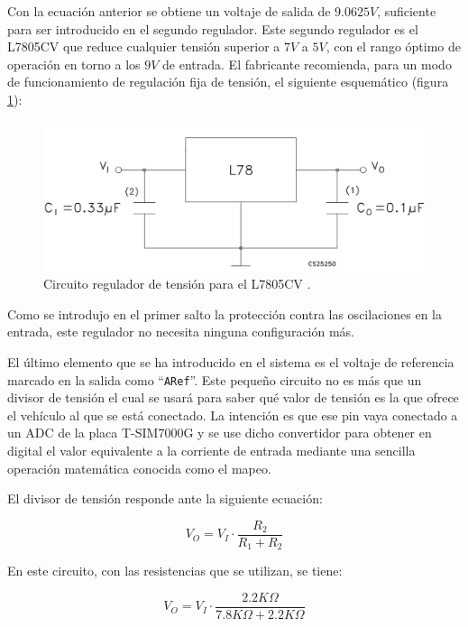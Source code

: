 Con la ecuación anterior se obtiene un voltaje de salida de $9.0625V$, suficiente
para ser introducido en el segundo regulador. Este segundo regulador es el
L7805CV que reduce cualquier tensión superior a $7V$ a $5V$, con el rango óptimo
de operación en torno a los $9V$ de entrada. El fabricante recomienda, para un
modo de funcionamiento de regulación fija de tensión, el siguiente esquemático
(figura \ref{fig:l78}):

\begin{figure}[H]
  \centering
  \includegraphics[width=\linewidth]{images/fixed-voltage.png}
  \caption{Circuito regulador de tensión para el L7805CV \cite{L7805CVSTMicroelectronicsMouser}.}
  \label{fig:l78}
\end{figure}

Como se introdujo en el primer salto la protección contra las oscilaciones en la
entrada, este regulador no necesita ninguna configuración más.

El último elemento que se ha introducido en el sistema es el voltaje de referencia
marcado en la salida como ``\texttt{ARef}''. Este pequeño circuito no es más que un
divisor de tensión el cual se usará para saber qué valor de tensión es la que ofrece
el vehículo al que se está conectado. La intención es que ese pin vaya conectado a un
\ac{ADC} de la placa T-SIM7000G y se use dicho convertidor para obtener en digital
el valor equivalente a la corriente de entrada mediante una sencilla operación matemática
conocida como el mapeo.

El divisor de tensión responde ante la siguiente ecuación:

\begin{equation*}
  V_O = V_I \cdot \frac{R_2}{R_1 + R_2}
\end{equation*}

En este circuito, con las resistencias que se utilizan, se tiene:

\begin{equation*}
  V_O = V_I \cdot \frac{2.2K\Omega}{7.8K\Omega + 2.2K\Omega}
\end{equation*}

